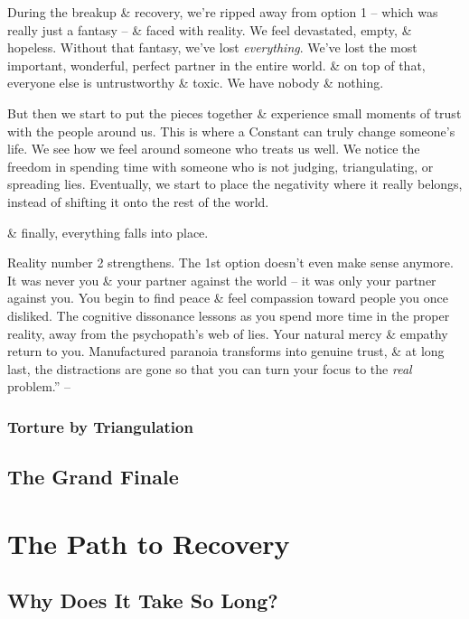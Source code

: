 \documentclass{article}
\numberwithin{equation}{section}
\begin{document}
During the breakup \& recovery, we're ripped away from option 1 -- which was really just a fantasy -- \& faced with reality. We feel devastated, empty, \& hopeless. Without that fantasy, we've lost \textit{everything}. We've lost the most important, wonderful, perfect partner in the entire world. \& on top of that, everyone else is untrustworthy \& toxic. We have nobody \& nothing.

But then we start to put the pieces together \& experience small moments of trust with the people around us. This is where a Constant can truly change someone's life. We see how we feel around someone who treats us well. We notice the freedom in spending time with someone who is not judging, triangulating, or spreading lies. Eventually, we start to place the negativity where it really belongs, instead of shifting it onto the rest of the world.

\& finally, everything falls into place.

Reality number 2 strengthens. The 1st option doesn't even make sense anymore. It was never you \& your partner against the world -- it was only your partner against you. You begin to find peace \& feel compassion toward people you once disliked. The cognitive dissonance lessons as you spend more time in the proper reality, away from the psychopath's web of lies. Your natural mercy \& empathy return to you. Manufactured paranoia transforms into genuine trust, \& at long last, the distractions are gone so that you can turn your focus to the \textit{real} problem.'' -- \cite[pp. 59--61]{MacKenzie2015}

\subsubsection{Torture by Triangulation}

\subsection{The Grand Finale}


\section{The Path to Recovery}

\subsection{Why Does It Take So Long?}
\end{document}

